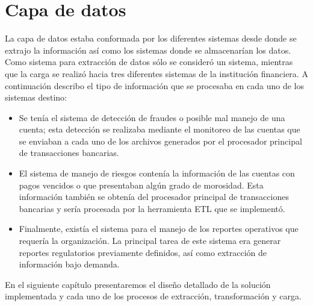 \section{Capa de datos}

La capa de datos estaba conformada por los diferentes sistemas desde donde se
extrajo la información así como los sistemas donde se almacenarían los
datos. Como sistema para extracción de datos sólo se consideró un sistema,
mientras que la carga se realizó hacia tres diferentes sistemas de la
institución financiera. A continuación describo el tipo de información que se
procesaba en cada uno de los sistemas destino:

\begin{itemize}

\item Se tenía el sistema de detección de fraudes o posible mal manejo de una
  cuenta; esta detección se realizaba mediante el monitoreo de las cuentas que
  se enviaban a cada uno de los archivos generados por el procesador principal
  de transacciones bancarias.

\item El sistema de manejo de riesgos contenía la información de las cuentas
  con pagos vencidos o que presentaban algún grado de morosidad. Esta
  información también se obtenía del procesador principal de transacciones
  bancarias y sería procesada por la herramienta ETL que se implementó.

\item Finalmente, existía el sistema para el manejo de los reportes operativos
  que requería la organización. La principal tarea de este sistema era generar
  reportes regulatorios previamente definidos, así como extracción de
  información bajo demanda.
\end{itemize}

En el siguiente capítulo presentaremos el diseño detallado de la solución
implementada y cada uno de los procesos de extracción, transformación y carga.

\cleardoublepage

